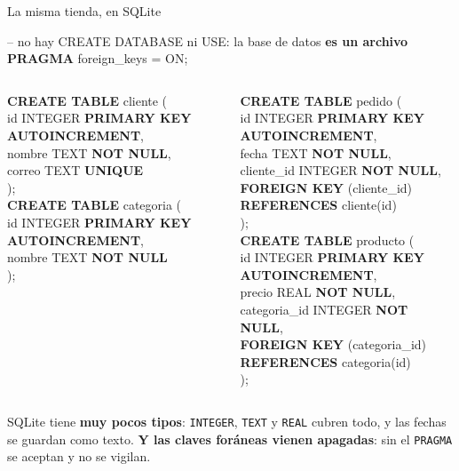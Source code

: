 \documentclass[aspectratio=169,10pt,c]{beamer}
\newcommand{\kw}[1]{\textcolor{utpRojo}{\textbf{#1}}}
\newcommand{\nuevo}[1]{{%
  \setlength{\fboxsep}{1.2pt}%
  \begingroup
  \renewcommand{\kw}[1]{\textcolor{utpNegro}{\textbf{##1}}}%
  \colorbox{yellow!45}{\textcolor{utpNegro}{#1}}%
  \endgroup}}
\newenvironment{sqlcode}[1][.86\textwidth]
  {\begin{center}\begin{lrbox}{\sqlbuf}\begin{minipage}{#1}\ttfamily\footnotesize\vspace{6pt}\raggedright}
  {\vspace{6pt}\end{minipage}\end{lrbox}\colorbox{utpGrisClaro}{\usebox{\sqlbuf}}\end{center}}
\newcommand{\ind}{\hspace*{1.6em}}
\begin{document}
\begin{frame}{La misma tienda, en \textnormal{SQLite}}
\begin{sqlcode}[.97\textwidth]
\scriptsize
\nuevo{-- no hay CREATE DATABASE ni USE: la base de datos \textbf{es un archivo}} \ \ \nuevo{\kw{PRAGMA} foreign\_keys = ON;}
\end{sqlcode}
\vspace{-0.25cm}
\begin{columns}[T,onlytextwidth]
\begin{sqlcode}[\textwidth]
\scriptsize
\kw{CREATE TABLE} cliente (\\
\ind id \nuevo{INTEGER} \kw{PRIMARY KEY} \nuevo{\kw{AUTOINCREMENT},}\\
\ind nombre \nuevo{TEXT} \kw{NOT NULL},\\
\ind correo \nuevo{TEXT} \kw{UNIQUE}\\
);\\[7pt]
\kw{CREATE TABLE} categoria (\\
\ind id \nuevo{INTEGER} \kw{PRIMARY KEY} \nuevo{\kw{AUTOINCREMENT},}\\
\ind nombre \nuevo{TEXT} \kw{NOT NULL}\\
);
\end{sqlcode}
\begin{sqlcode}[\textwidth]
\scriptsize
\kw{CREATE TABLE} pedido (\\
\ind id \nuevo{INTEGER} \kw{PRIMARY KEY} \nuevo{\kw{AUTOINCREMENT},}\\
\ind fecha \nuevo{TEXT} \kw{NOT NULL},\\
\ind cliente\_id INTEGER \kw{NOT NULL},\\
\ind \kw{FOREIGN KEY} (cliente\_id)\\
\ind\ind \kw{REFERENCES} cliente(id)\\
);\\[7pt]
\kw{CREATE TABLE} producto (\\
\ind id \nuevo{INTEGER} \kw{PRIMARY KEY} \nuevo{\kw{AUTOINCREMENT},}\\
\ind precio \nuevo{REAL} \kw{NOT NULL},\\
\ind categoria\_id INTEGER \kw{NOT NULL},\\
\ind \kw{FOREIGN KEY} (categoria\_id)\\
\ind\ind \kw{REFERENCES} categoria(id)\\
);
\end{sqlcode}
\end{columns}
\vspace{0.15cm}
\small SQLite tiene \textbf{muy pocos tipos}: \texttt{INTEGER}, \texttt{TEXT} y \texttt{REAL} cubren todo, y las fechas se guardan como texto. \textbf{Y las claves foráneas vienen apagadas}: sin el \texttt{PRAGMA} se aceptan y no se vigilan.
\end{frame}
\end{document}
